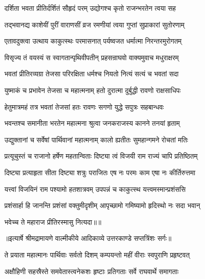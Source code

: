 \twolineshloka
{दर्शिता भवता प्रीतिर्दर्शितं सौहृदं परम्}
{उद्योगश्च कृतो राजन्भरतेन त्वया सह} %

\twolineshloka
{तद्भवानद्य काशेयीं पुरीं वाराणसीं व्रज}
{रमणीयां त्वया गुप्तां सुप्राकारां सुतोरणाम्} %

\twolineshloka
{एतावदुक्त्वा उत्थाय काकुत्स्थः परमासनात्}
{पर्यष्वजत धर्मात्मा निरन्तरमुरोगतम्} %

\twolineshloka
{विसृज्य तं वयस्यं स स्वागतान्पृथिवीपतीन्}
{प्रहसन्राघवो वाक्यमुवाच मधुराक्षरम्} %

\twolineshloka
{भवतां प्रीतिरव्यग्रा तेजसा परिरक्षिता}
{धर्मश्च नियतो नित्यं सत्यं च भवतां सदा} %

\twolineshloka
{युष्माकं च प्रभावेन तेजसा च महात्मनाम्}
{हतो दुरात्मा दुर्बुद्धी रावणो राक्षसाधिपः} %

\twolineshloka
{हेतुमात्रमहं तत्र भवतां तेजसां हतः}
{रावणः सगणो युद्धे सपुत्रः सहबान्धवः} %

\twolineshloka
{भवन्तश्च समानीता भरतेन महात्मना}
{श्रुत्वा जनकराजस्य कानने तनयां हृताम्} %

\twolineshloka
{उद्युक्तानां च सर्वेषां पार्थिवानां महात्मनाम्}
{कालो ह्यतीतः सुमहान्गमने रोचतां मतिः} %

\twolineshloka
{प्रत्यूचुस्तं च राजानो हर्षेण महतान्विताः}
{दिष्ट्या त्वं विजयी राम राज्यं चापि प्रतिष्ठितम्} %

\twolineshloka
{दिष्ट्या प्रत्याहृता सीता दिष्ट्या शत्रुः पराजितः}
{एष नः परमः काम एषा नः कीर्तिरुत्तमा} %

\twolineshloka
{यत्त्वां विजयिनं राम पश्यामो हतशात्रवम्}
{उपपन्नं च काकुत्स्थ यत्त्वमस्मान्प्रशंससि} %

\twolineshloka
{प्रशंसार्हा हि जानन्ति प्रशंसां वक्तुमीदृशीम्}
{आपृच्छामो गमिष्यामो हृदिस्थो नः सदा भवान्} %

{भवेच्च ते महाराज प्रीतिरस्मासु नित्यदा॥॥} %

\addtocounter{shlokacount}{1}


{॥इत्यार्षे श्रीमद्रामायणे वाल्मीकीये आदिकाव्ये उत्तरकाण्डे सप्तत्रिंशः सर्गः॥}


\twolineshloka
{ते प्रयाता महात्मानः पार्थिवाः सर्वतो दिशम्}
{कम्पयन्तो महीं वीराः स्वपुराणि प्रहृष्टवत्} %

\twolineshloka
{अक्षौहिणी सहस्रैस्ते समवेतास्त्वनेकशः}
{हृष्टाः प्रतिगताः सर्वे राघवार्थे समागताः} %

